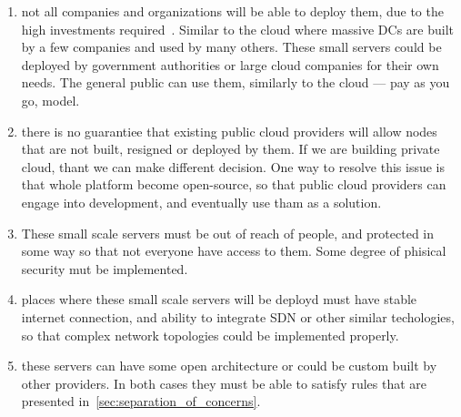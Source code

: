 \begin{enumerate}[start=1,label={(\bfseries \arabic*)}]
	\item not all companies and organizations will be able to deploy them, due to the high investments required~\cite{MonsalveCC18}. Similar to the cloud where massive DCs are built by a few companies and used by many others. These small servers could be deployed by government authorities or large cloud companies for their own needs. The general public can use them, similarly to the cloud --- pay as you go, model.
	\item there is no guarantiee that existing public cloud providers will allow nodes that are not built, resigned or deployed by them. If we are building private cloud, thant we can make different decision. One way to resolve this issue is that whole platform become open-source, so that public cloud providers can engage into development, and eventually use tham as a solution.
	\item These small scale servers must be out of reach of people, and protected in some way so that not everyone have access to them. Some degree of phisical security mut be implemented.
	\item places where these small scale servers will be deployd must have stable internet connection, and ability to integrate SDN or other similar techologies, so that complex network topologies could be implemented properly.
	\item these servers can have some open architecture or could be custom built by other providers. In both cases they must be able to satisfy rules that are presented in~\ref{sec:separation_of_concerns}.
\end{enumerate}
%
%